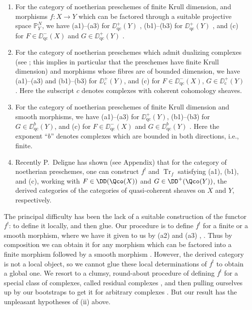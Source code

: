 \begin{enumerate}
	\item[(i)] For the category of noetherian preschemes of finite Krull dimension, and morphisms $f\colon X\to Y$ which can be factored through a suitable projective space $\mathbb{P}_{Y}^{N}$, we have (a1)--(a3) for $\DD_{\mathrm{qc}}^{+}(Y)$ , (b1)--(b3) for $\DD_{\mathrm{qc}}^{+}(Y)$ , and (c) for $F\in \DD_{\mathrm{qc}}^{-}(X)$ and $G\in \DD_{\mathrm{qc}}^{+}(Y)$ .
	
	\item[(ii)] For the category of noetherian preschemes which admit dualizing complexes (see ; this implies in particular that the preschemes have finite Krull dimension) and morphisms whose fibres are of bounded dimension, we have (a1)--(a3) and (b1)--(b3) for $\DD_{\mathrm{c}}^{+}(Y)$, and (c) for $F\in \DD_{\mathrm{qc}}^{-}(X)$, $G\in \DD_{\mathrm{c}}^{+}(Y)$ . Here the subscript $c$ denotes complexes with coherent cohomology sheaves.
	
	\item[(iii)] For the category of noetherian preschemes of finite Krull dimension and smooth morphisms, we have (a1)--(a3) for $\DD_{\mathrm{qc}}^{+}(Y)$, (b1)--(b3) for $G\in \DD_{\mathrm{qc}}^{b}(Y)$, and (c) for $F\in \DD_{\mathrm{qc}}^{-}(X)$ and $G\in \DD_{\mathrm{qc}}^{b}(Y)$ . Here the exponent ``$b$'' denotes complexes which are bounded in both directions, i.e., finite.
	
	\item[(iv)] Recently P.~Deligne has shown (see Appendix) that for the category of noetherian preschemes, one can construct $f^{!}$ and $\operatorname{Tr}_{f}$ satisfying (a1), (b1), and (c), working with $F\in \DD(\Qco(X))$ and $G\in \DD^{+}(\Qco(Y))$, the derived categories of the categories of quasi-coherent sheaves on $X$ and $Y$, respectively.
\end{enumerate}

The principal difficulty has been the lack of a suitable construction of the functor $f^{!}$: to define it locally, and then glue. Our procedure is to define $f^{!}$ for a finite or a smooth morphism, where we have it given to us by (a2) and (a3) , . Thus by composition we can obtain it for any morphism which can be factored into a finite morphism followed by a smooth morphism . However, the derived category is not a local object, so we cannot glue these local determinations of $f^{!}$ to obtain a global one. We resort to a clumsy, round-about procedure of defining $f^{!}$ for a special class of complexes, called residual complexes , and then pulling ourselves up by our bootstraps to get it for arbitrary complexes . But our result has the unpleasant hypotheses of (ii) above.

